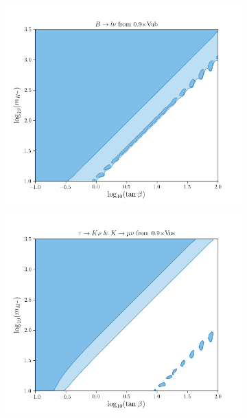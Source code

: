 \documentclass[11pt]{article}
\begin{document}
\begin{figure}[H]
\begin{subfigure}[b]{0.45\textwidth}
        \includegraphics[width=\textwidth]{vub/Blnu0.9.png}
    \end{subfigure}
    \begin{subfigure}[b]{0.45\textwidth}
        \includegraphics[width=\textwidth]{vus/Klnu0.9.png}
    \end{subfigure}
\end{figure}
\newpage
\end{document}
